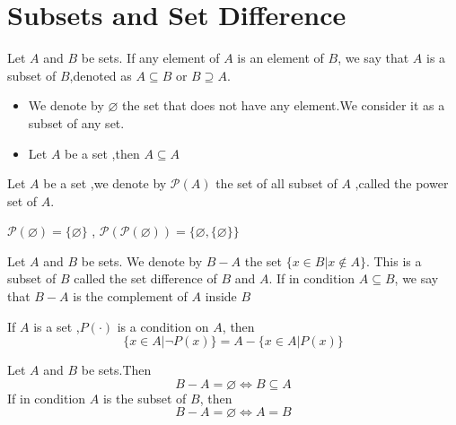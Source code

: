 \documentclass{book}
\begin{document}
\section{Subsets and Set Difference}
\begin{definitionenv}
    Let $A$ and $B$ be sets. If any element of $A$ is an element of $B$, we say that $A$ is a subset of $B$,denoted as $A \subseteq B$ or $B\supseteq  A$.
\end{definitionenv}
\begin{exampleenv}
    \quad
   \begin{itemize}
    \item  We denote by $\varnothing $ the set that does not have any element.We consider it as a subset of any set.
   \item  Let $A$ be a set ,then $A\subseteq A$
    \end{itemize}
\end{exampleenv}
\begin{definitionenv}
    Let $A$ be a set ,we denote by $\mathcal{P} (A)$ the set of all subset of $A$ ,called the power set of $A$.
\end{definitionenv}
\begin{exampleenv}
    $\mathcal{P} (\varnothing)=\{\varnothing\}$
    ,
    $\mathcal{P} (\mathcal{P} (\varnothing))=\{\varnothing,\{\varnothing\}\}$
\end{exampleenv}
\begin{definitionenv}
    Let $A$ and $B$ be sets. We denote by $B - A$ the set $\{x\in B|x\notin A\}$. This is a subset of $B$ called the set difference of $B$ and $A$.
    \newline
    If in condition $A \subseteq B$, we say that $B-A$ is the complement of $A$ inside $B$
\end{definitionenv}
\begin{exampleenv}
    If $A$ is a set ,$P(\cdot)$ is  a condition on $A$, then $$\{x\in A |\neg P(x)\}=A-\{x\in A|P(x)\}$$
\end{exampleenv}
\begin{propositionenv}
    Let $A$ and $B$ be sets.Then $$B-A=\varnothing \Leftrightarrow B\subseteq A$$
    If in condition $A$ is the subset of $B$, then $$B-A=\varnothing \Leftrightarrow A=B$$
\end{propositionenv}
\end{document}
